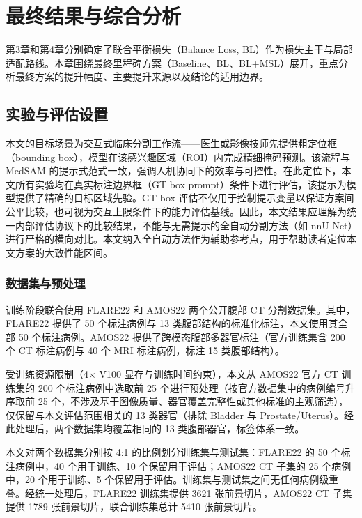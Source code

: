\chapter{最终结果与综合分析}

第3章和第4章分别确定了联合平衡损失（Balance Loss, BL）作为损失主干与局部适配路线。本章围绕最终里程碑方案（Baseline、BL、BL+MSL）展开，重点分析最终方案的提升幅度、主要提升来源以及结论的适用边界。

\section{实验与评估设置}

本文的目标场景为交互式临床分割工作流——医生或影像技师先提供粗定位框（bounding box），模型在该感兴趣区域（ROI）内完成精细掩码预测。该流程与 MedSAM 的提示式范式一致\cite{ma2024medsam}，强调人机协同下的效率与可控性。在此定位下，本文所有实验均在真实标注边界框（GT box prompt）条件下进行评估，该提示为模型提供了精确的目标区域先验。GT box 评估不仅用于控制提示变量以保证方案间公平比较，也可视为交互上限条件下的能力评估基线。因此，本文结果应理解为统一内部评估协议下的比较结果，不能与无需提示的全自动分割方法（如 nnU-Net）进行严格的横向对比。本文纳入全自动方法作为辅助参考点，用于帮助读者定位本文方案的大致性能区间。

\subsection{数据集与预处理}

训练阶段联合使用 FLARE22 和 AMOS22 两个公开腹部 CT 分割数据集\cite{ma2022flare,ji2022amos}。其中，FLARE22 提供了 50 个标注病例与 13 类腹部结构的标准化标注，本文使用其全部 50 个标注病例。AMOS22 提供了跨模态腹部多器官标注（官方训练集含 200 个 CT 标注病例与 40 个 MRI 标注病例，标注 15 类腹部结构）。

受训练资源限制（4$\times$ V100 显存与训练时间约束），本文从 AMOS22 官方 CT 训练集的 200 个标注病例中选取前 25 个进行预处理（按官方数据集中的病例编号升序取前 25 个，不涉及基于图像质量、器官覆盖完整性或其他标准的主观筛选），仅保留与本文评估范围相关的 13 类器官（排除 Bladder 与 Prostate/Uterus）。经此处理后，两个数据集均覆盖相同的 13 类腹部器官，标签体系一致。

本文对两个数据集分别按 4:1 的比例划分训练集与测试集：FLARE22 的 50 个标注病例中，40 个用于训练、10 个保留用于评估；AMOS22 CT 子集的 25 个病例中，20 个用于训练、5 个保留用于评估。训练集与测试集之间无任何病例级重叠。经统一处理后，FLARE22 训练集提供 3621 张前景切片，AMOS22 CT 子集提供 1789 张前景切片，联合训练集总计 5410 张前景切片。

